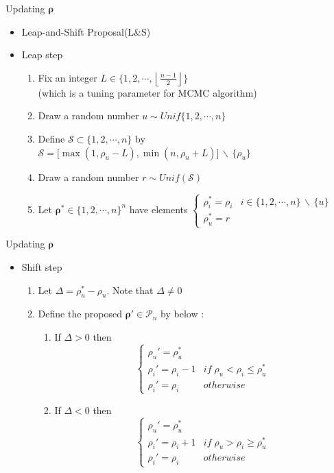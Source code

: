 \documentclass[11pt]{beamer}
\newcommand{\diff}{\,\backslash\,}
\newcommand{\floor}[1]{\left\lfloor #1 \right\rfloor}
\begin{document}
\begin{frame}{Updating $\boldsymbol{\rho}$}
\begin{itemize}
    \item Leap-and-Shift Proposal(L\&S)
    \item Leap step
        \begin{enumerate}
            \item Fix an integer $L\in \{1,2,\cdots, \floor{\frac{n-1}{2}}\}$ \\
            (which is a tuning parameter for MCMC algorithm)
            \item Draw a random number $u\sim Unif\{1,2,\cdots, n\}$
            \item Define $\mathcal{S}\subset \{1,2,\cdots, n\}$ by $\mathcal{S}=\big[\max (1, \rho_u-L), \min (n, \rho_u+L)\big]\diff\{\rho_u\}$
            \item Draw a random number $r\sim Unif(\mathcal{S})$
            \item Let $\boldsymbol{\rho}^*\in \{1,2,\cdots, n\}^n$ have elements $\begin{cases}
            \rho_i^*=\rho_i & i\in \{1,2,\cdots,n\}\diff \{u\} \\\rho_u^*=r \end{cases}$
             
        \end{enumerate}
\end{itemize}
\end{frame}

\begin{frame}{Updating $\boldsymbol{\rho}$}
\begin{itemize}
    \item Shift step
    \begin{enumerate}
        \item Let $\Delta=\rho_u^*-\rho_u$. Note that $\Delta\neq 0$ 
        \item Define the proposed $\boldsymbol{\rho}'\in \mathcal{P}_n$ by below :
        \begin{enumerate}
            \item If $\Delta>0$ then 
            $$\begin{cases}
                \rho_u'=\rho_u^* \\ \rho_i'=\rho_i-1 & if \; \rho_u<\rho_i\leq \rho_u^* \\ \rho_i'=\rho_i & otherwise
            \end{cases} $$
            \item If $\Delta<0$ then 
            $$\begin{cases}
                \rho_u'=\rho_u^* \\ \rho_i'=\rho_i+1 & if \; \rho_u>\rho_i\geq \rho_u^* \\ \rho_i'=\rho_i & otherwise
            \end{cases} $$
        \end{enumerate} 
    \end{enumerate}
\end{itemize}
\end{frame}
\end{document}
